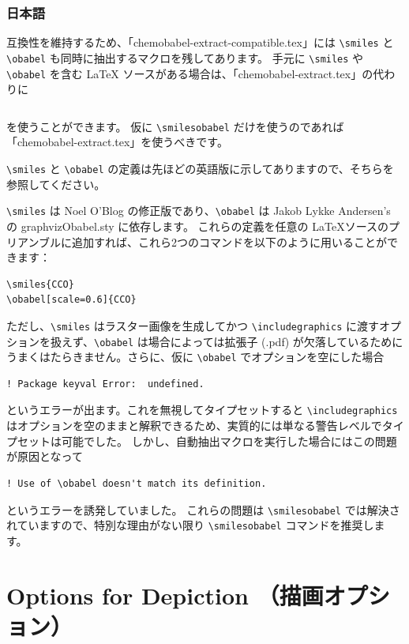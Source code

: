 \documentclass[12pt]{jsarticle}
\begin{document}
\subsubsection{日本語}

互換性を維持するため、「chemobabel-extract-compatible.tex」には \verb|\smiles| と \verb|\obabel| も同時に抽出するマクロを残してあります。
手元に \verb|\smiles| や \verb|\obabel| を含む {\LaTeX} ソースがある場合は、「chemobabel-extract.tex」の代わりに
\begin{verbatim}

\end{verbatim}
を使うことができます。
仮に \verb|\smilesobabel| だけを使うのであれば「chemobabel-extract.tex」を使うべきです。

\verb|\smiles| と \verb|\obabel| の定義は先ほどの英語版に示してありますので、そちらを参照してください。

\verb|\smiles| は Noel O'Blog \cite{NOB1} の修正版であり、\verb|\obabel| は Jakob Lykke Andersen's \cite{JLA} の \textsf{graphvizObabel.sty} に依存します。
これらの定義を任意の \LaTeX ソースのプリアンブルに追加すれば、これら2つのコマンドを以下のように用いることができます：
\begin{verbatim}
\smiles{CCO}
\obabel[scale=0.6]{CCO}
\end{verbatim}
ただし、\verb|\smiles| はラスター画像を生成してかつ \verb|\includegraphics| に渡すオプションを扱えず、\verb|\obabel| は場合によっては拡張子 (.pdf) が欠落しているためにうまくはたらきません。さらに、仮に \verb|\obabel| でオプションを空にした場合
\begin{verbatim}
! Package keyval Error:  undefined.
\end{verbatim}
というエラーが出ます。これを無視してタイプセットすると \verb|\includegraphics| はオプションを空のままと解釈できるため、実質的には単なる警告レベルでタイプセットは可能でした。
しかし、自動抽出マクロを実行した場合にはこの問題が原因となって
\begin{verbatim}
! Use of \obabel doesn't match its definition.
\end{verbatim}
というエラーを誘発していました。
これらの問題は \verb|\smilesobabel| では解決されていますので、特別な理由がない限り \verb|\smilesobabel| コマンドを推奨します。

\clearpage

\section{Options for Depiction （描画オプション）} \label{depict}
\end{document}
